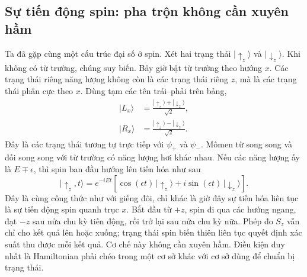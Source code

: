 \begin{classroomqa}
\end{classroomqa}

\begin{classroomqa}
\end{classroomqa}

\subsection{Sự tiến động spin: pha trộn không cần xuyên hầm}

Ta đã gặp cùng một cấu trúc đại số ở spin. Xét hai trạng thái \(|\uparrow_z\rangle\) và \(|\downarrow_z\rangle\). Khi không có từ trường, chúng suy biến. Bây giờ bật từ trường theo hướng \(x\). Các trạng thái riêng năng lượng không còn là các trạng thái riêng \(z\), mà là các trạng thái phân cực theo \(x\). Dùng tạm các tên trái--phải trên bảng,
\begin{align}
|L_x\rangle &= \frac{|\uparrow_z\rangle+|\downarrow_z\rangle}{\sqrt{2}},\\
|R_x\rangle &= \frac{|\uparrow_z\rangle-|\downarrow_z\rangle}{\sqrt{2}}.
\end{align}
Đây là các trạng thái tương tự trực tiếp với \(\psi_+\) và \(\psi_-\). Mômen từ song song và đối song song với từ trường có năng lượng hơi khác nhau. Nếu các năng lượng ấy là \(E\mp\epsilon\), thì spin ban đầu hướng lên tiến hóa như sau
\begin{equation}
|\uparrow_z,t\rangle
= e^{-iEt}\left[\cos(\epsilon t)\,|\uparrow_z\rangle
+ i\sin(\epsilon t)\,|\downarrow_z\rangle\right].
\end{equation}
Đây là cùng công thức như với giếng đôi, chỉ khác là giờ đây sự tiến hóa liên tục là sự tiến động spin quanh trục \(x\). Bắt đầu từ \(+z\), spin đi qua các hướng ngang, đạt \(-z\) sau nửa chu kỳ tiến động, rồi trở lại sau nửa chu kỳ nữa. Phép đo \(S_z\) vẫn chỉ cho kết quả lên hoặc xuống; trạng thái spin biến thiên liên tục quyết định xác suất thu được mỗi kết quả. Cơ chế này không cần xuyên hầm. Điều kiện duy nhất là Hamiltonian phải chéo trong một cơ sở khác với cơ sở dùng để chuẩn bị trạng thái.

